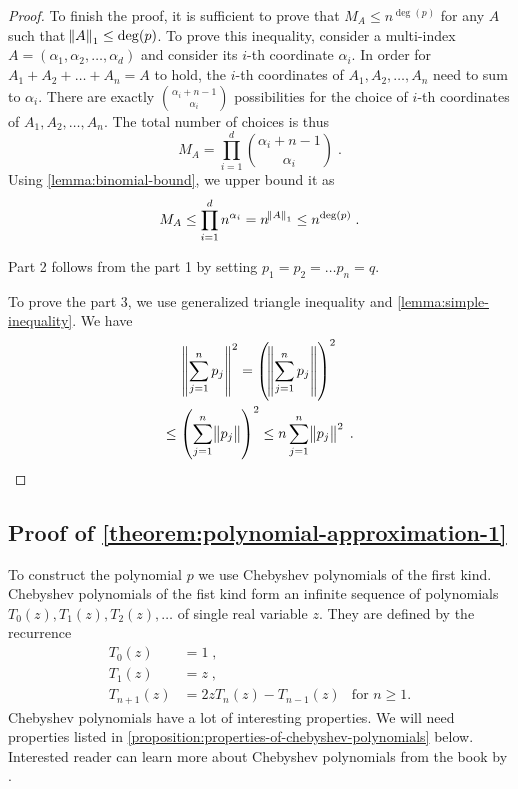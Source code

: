\begin{proof}
To finish the proof, it is sufficient to prove that $M_A \le n^{\deg(p)}$ for
any $A$ such that $\norm{A}_1 \le \deg(p)$. To prove this inequality, consider a
multi-index $A = (\alpha_1, \alpha_2, \dots, \alpha_d)$ and consider its $i$-th coordinate
$\alpha_i$. In order for $A_1 + A_2 + \dots + A_n = A$ to hold, the $i$-th
coordinates of $A_1, A_2, \dots, A_n$ need to sum to $\alpha_i$. There are exactly
$\binom{\alpha_i + n - 1}{\alpha_i}$ possibilities for the choice of $i$-th
coordinates of $A_1, A_2, \dots, A_n$. The total number of choices is thus
$$
M_A = \prod_{i=1}^d \binom{\alpha_i + n - 1}{\alpha_i} \; .
$$
Using \autoref{lemma:binomial-bound}, we upper bound it as
$$
M_A \le \prod_{i=1}^d n^{\alpha_i} = n^{\norm{A}_1} \le n^{\deg(p)} \; .
$$

Part 2 follows from the part 1 by setting $p_1 = p_2 = \dots p_n = q$.

To prove the part 3, we use generalized triangle inequality and
\autoref{lemma:simple-inequality}. We have
\begin{multline*}
\norm{\sum_{j=1}^n p_j}^2 = \left( \norm{\sum_{j=1}^n p_j} \right)^2 \\ \le \left(\sum_{j=1}^n \norm{p_j} \right)^2 \le n \sum_{j=1}^n \norm{p_j}^2 \; .
\end{multline*}
\end{proof}

\subsection{Proof of \autoref{theorem:polynomial-approximation-1}}
\label{section:proof-of-polynomial-approximation-1}

To construct the polynomial $p$ we use Chebyshev polynomials of the first kind.
Chebyshev polynomials of the fist kind form an infinite sequence of polynomials
$T_0(z), T_1(z), T_2(z), \dots$ of single real variable $z$. They are defined
by the recurrence
\begin{align*}
T_0(z) & = 1 \; , \\
T_1(z) & = z \; , \\
T_{n+1}(z) & = 2zT_n(z) - T_{n-1}(z) & \text{for $n \ge 1$.}
\end{align*}
Chebyshev polynomials have a lot of interesting properties.
We will need properties listed in
\autoref{proposition:properties-of-chebyshev-polynomials} below.
Interested reader can learn more about Chebyshev polynomials
from the book by \cite{Mason-Handscomb-2002}.


